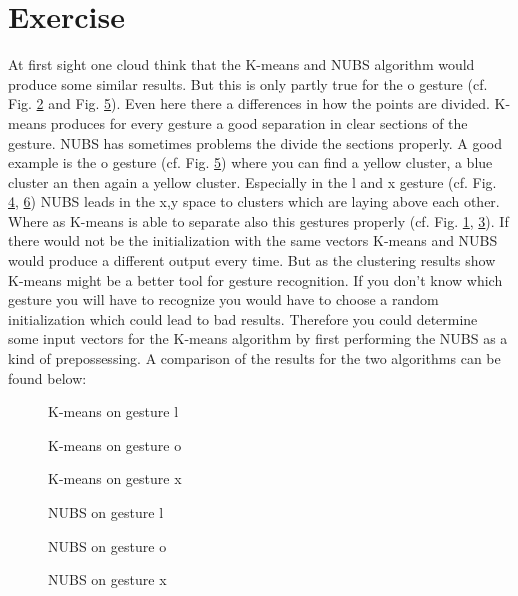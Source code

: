 \documentclass[conference]{IEEEtran}
\begin{document}
\section{Exercise}
At first sight one cloud think that the K-means and NUBS algorithm would produce some similar results. But this is only partly true for the o gesture (cf. Fig. \ref{fig:kmean_o} and Fig. \ref{fig:nubs_o}). Even here there a differences in how the points are divided. K-means produces for every gesture a good separation in clear sections of the gesture. NUBS has sometimes problems the divide the sections properly. A good example is the o gesture (cf. Fig. \ref{fig:nubs_o}) where you can find a yellow cluster, a blue cluster an then again a yellow cluster. Especially in the l and x gesture (cf. Fig. \ref{fig:nubs_l}, \ref{fig:nubs_x}) NUBS leads in the x,y space to clusters which are laying above each other. Where as K-means is able to separate also this gestures properly (cf. Fig. \ref{fig:kmean_l}, \ref{fig:kmean_x}). If there would not be the initialization with the same vectors K-means and NUBS would produce a different output every time. But as the clustering results show K-means might be a better tool for gesture recognition. If you don't know which gesture you will have to recognize you would have to choose a random initialization which could lead to bad results. Therefore you could determine some input vectors for the K-means algorithm by first performing the NUBS as a kind of prepossessing. A comparison of the results for the two algorithms can be found below:


\begin{figure}[h!]
  	\centering
    \scalebox{.47}{}
    \caption{K-means on gesture l}
    \label{fig:kmean_l}
\end{figure}
\vspace{-10pt}
\begin{figure}[h!]
  	\centering
    \scalebox{.47}{}
    \caption{K-means on gesture o}
    \label{fig:kmean_o}
\end{figure}
\vspace{-10pt}
\begin{figure}[h!]
  	\centering
    \scalebox{.47}{}
    \caption{K-means on gesture x}
    \label{fig:kmean_x}
\end{figure}
\vspace{-20pt}
\begin{figure}[h!]
  	\centering
    \scalebox{.47}{}
    \caption{NUBS on gesture l}
    \label{fig:nubs_l}
\end{figure}
\vspace{-20pt}
\begin{figure}[h!]
  	\centering
    \scalebox{.47}{}
    \caption{NUBS on gesture o}
    \label{fig:nubs_o}
\end{figure}
\vspace{-20pt}
\begin{figure}[h!]
  	\centering
    \scalebox{.47}{}
    \caption{NUBS on gesture x}
    \label{fig:nubs_x}
\end{figure}
\end{document}
